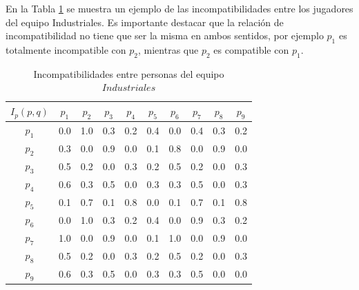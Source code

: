 En la Tabla \ref{iep-pel} se muestra un ejemplo de las incompatibilidades entre los jugadores del equipo Industriales. Es importante destacar que la relación de incompatibilidad no tiene que ser la misma en ambos sentidos, por ejemplo $p_1$  es totalmente incompatible con $p_2$, mientras que $p_2$ es compatible con $p_1$.

\begin{table}[H]
	\centering
	\caption{Incompatibilidades entre personas del equipo $Industriales$}\label{iep-pel}
	\begin{tabular}{|c|c|c|c|c|c|c|c|c|c|}
		\hline
		$I_p(p,q)$ & $p_1$ & $p_2$ & $p_3$  & $p_4$ & $p_5$ & $p_6$ & $p_7$ & $p_8$  & $p_9$ \\ \hline
		$p_1$ 	& 0.0 & 1.0 & 0.3 & 0.2 & 0.4 & 0.0 & 0.4 & 0.3 & 0.2 \\ \hline
		$p_2$  	& 0.3 & 0.0 & 0.9 & 0.0 & 0.1 & 0.8 & 0.0 & 0.9 & 0.0 \\ \hline
		$p_3$ 	& 0.5 & 0.2 & 0.0 & 0.3 & 0.2 & 0.5 & 0.2 & 0.0 & 0.3 \\ \hline
		$p_4$ 	& 0.6 & 0.3 & 0.5 & 0.0 & 0.3 & 0.3 & 0.5 & 0.0 & 0.3 \\ \hline
		$p_5$ 	& 0.1 & 0.7 & 0.1 & 0.8 & 0.0 & 0.1 & 0.7 & 0.1 & 0.8 \\ \hline
		$p_6$ 	& 0.0 & 1.0 & 0.3 & 0.2 & 0.4 & 0.0 & 0.9 & 0.3 & 0.2 \\ \hline
		$p_7$  	& 1.0 & 0.0 & 0.9 & 0.0 & 0.1 & 1.0 & 0.0 & 0.9 & 0.0 \\ \hline
		$p_8$ 	& 0.5 & 0.2 & 0.0 & 0.3 & 0.2 & 0.5 & 0.2 & 0.0 & 0.3 \\ \hline
		$p_9$ 	& 0.6 & 0.3 & 0.5 & 0.0 & 0.3 & 0.3 & 0.5 & 0.0 & 0.0 \\ \hline
	\end{tabular}
\end{table}



